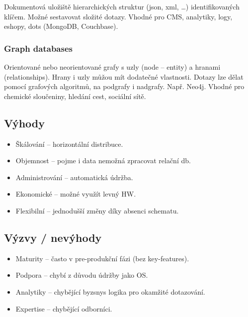 Dokumentová uložiště hierarchických struktur (json, xml, \dots) identifikovaných klíčem.
Možné sestavovat složité dotazy.
Vhodné pro CMS, analytiky, logy, eshopy, dots (MongoDB, Couchbase).

\subsubsection*{Graph databases}

Orientované nebo neorientované grafy s uzly (node -- entity) a hranami (relationships).
Hrany i uzly můžou mít dodatečné vlastnosti.
Dotazy lze dělat pomocí grafových algoritmů, na podgrafy i nadgrafy.
Např. Neo4j.
Vhodné pro chemické sloučeniny, hledání cest, sociální sítě.


\subsection*{Výhody}

\begin{itemize}
    \item Škálování -- horizontální distribuce.
    \item Objemnost -- pojme i data nemožná zpracovat relační db.
    \item Administrování -- automatická údržba.
    \item Ekonomické -- možné využít levný HW.
    \item Flexibilní -- jednodušší změny díky absenci schematu.
\end{itemize}

\subsection*{Výzvy / nevýhody}

\begin{itemize}
    \item Maturity -- často v pre-produkční fázi (bez key-features).
    \item Podpora -- chybí z důvodu údržby jako OS.
    \item Analytiky -- chybějící byzsnys logika pro okamžité dotazování.
    \item Expertise -- chybějící odborníci.
\end{itemize}